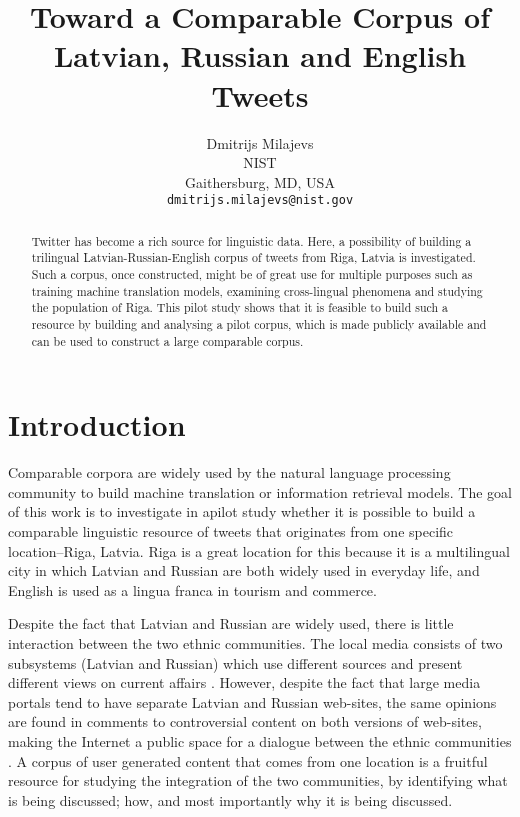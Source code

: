\documentclass[11pt,a4paper]{article}
\title{Toward a Comparable Corpus of Latvian, Russian and English Tweets}
\author{Dmitrijs Milajevs \\
  NIST \\
  Gaithersburg, MD, USA \\
  {\tt dmitrijs.milajevs@nist.gov}}
\date{}
\begin{document}
\maketitle

\begin{abstract}
Twitter has become a rich source for linguistic data. Here, a possibility of building a trilingual Latvian-Russian-English corpus of tweets from Riga, Latvia is investigated. Such a corpus, once constructed, might be of great use for multiple purposes such as training machine translation models, examining cross-lingual phenomena and studying the population of Riga. This pilot study shows that it is feasible to build such a resource by building and analysing a pilot corpus, which is made publicly available and can be used to construct a large comparable corpus.
\end{abstract}

\section{Introduction}
\label{sec:introduction}

Comparable corpora are widely used by the natural language processing community to build machine translation or information retrieval models. The goal of this work is to investigate in  apilot study whether it is possible to build a comparable linguistic resource of tweets that originates from one specific location--Riga, Latvia. Riga is a great location for this because it is a multilingual city in which Latvian and Russian are both widely used in everyday life, and English is used as a lingua franca in tourism and commerce.

Despite the fact that Latvian and Russian are widely used, there is little interaction between the two ethnic communities. The local media consists of two subsystems (Latvian and Russian) which use different sources and present different views on current affairs \cite{muiznieks2010}. However, despite the fact that large media portals tend to have separate Latvian and Russian web-sites, the same opinions are found in comments to controversial content on both versions of web-sites, making the Internet a public space for a dialogue  between the ethnic communities \cite{sulmane2010}. A corpus of user generated content that comes from one location is a fruitful resource for studying the integration of the two communities, by identifying what is being discussed; how, and most importantly why it is being discussed.
\end{document}
